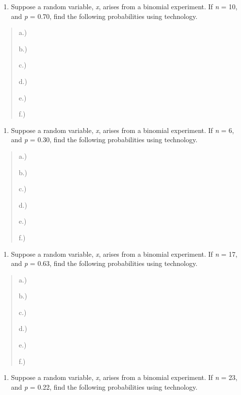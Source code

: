 \documentclass[]{book}
\providecommand{\tightlist}{%
  \setlength{\itemsep}{0pt}\setlength{\parskip}{0pt}}
\begin{document}
\begin{enumerate}
\def\labelenumi{\arabic{enumi}.}
\setcounter{enumi}{2}
\tightlist
\item
  Suppose a random variable, \emph{x}, arises from a binomial experiment. If \emph{n} = 10, and \emph{p} = 0.70, find the following probabilities using technology.
\end{enumerate}

\begin{quote}
a.)

b.)

c.)

d.)

e.)

f.)
\end{quote}

\begin{enumerate}
\def\labelenumi{\arabic{enumi}.}
\setcounter{enumi}{3}
\tightlist
\item
  Suppose a random variable, \emph{x}, arises from a binomial experiment.
  If \emph{n} = 6, and \emph{p} = 0.30, find the following probabilities using
  technology.
\end{enumerate}

\begin{quote}
a.)

b.)

c.)

d.)

e.)

f.)
\end{quote}

\begin{enumerate}
\def\labelenumi{\arabic{enumi}.}
\setcounter{enumi}{4}
\tightlist
\item
  Suppose a random variable, \emph{x}, arises from a binomial experiment.
  If \emph{n} = 17, and \emph{p} = 0.63, find the following probabilities using
  technology.
\end{enumerate}

\begin{quote}
a.)

b.)

c.)

d.)

e.)

f.)
\end{quote}

\begin{enumerate}
\def\labelenumi{\arabic{enumi}.}
\setcounter{enumi}{5}
\tightlist
\item
  Suppose a random variable, \emph{x}, arises from a binomial experiment.
  If \emph{n} = 23, and \emph{p} = 0.22, find the following probabilities using
  technology.
\end{enumerate}
\end{document}
